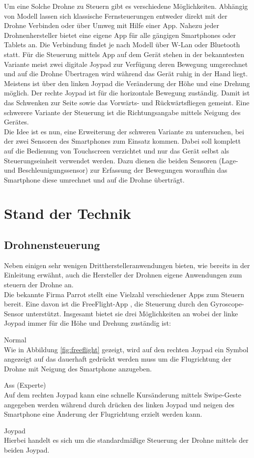 \documentclass{article}
\begin{document}
Um eine Solche Drohne zu Steuern gibt es verschiedene Möglichkeiten. Abhängig von Modell lassen sich klassische Fernsteuerungen\cite{flypad} entweder direkt mit der Drohne Verbinden oder über Umweg mit Hilfe einer App. Nahezu jeder Drohnenhersteller bietet eine eigene App für alle gängigen Smartphones oder Tablets an. Die Verbindung findet je nach Modell über W-Lan oder Bluetooth statt. Für die Steuerung mittels App auf dem Gerät stehen in der bekanntesten Variante meist zwei digitale Joypad zur Verfügung deren Bewegung umgerechnet und auf die Drohne Übertragen wird während das Gerät ruhig in der Hand liegt. Meistens ist über den linken Joypad die Veränderung der Höhe und eine Drehung möglich. Der rechte Joypad ist für die horizontale Bewegung zuständig. Damit ist das Schwenken zur Seite sowie das Vorwärts- und Rückwärtsfliegen gemeint. Eine schwerere Variante der Steuerung ist die Richtungsangabe mittels Neigung des Gerätes.
\\ Die Idee ist es nun, eine Erweiterung der schweren Variante zu untersuchen, bei der zwei Sensoren des Smartphones zum Einsatz kommen. Dabei soll komplett auf die Bedienung von Touchscreen verzichtet und nur das Gerät selbst als Steuerungseinheit verwendet werden. Dazu dienen die beiden Sensoren (Lage- und Beschleunigungssensor) zur Erfassung der Bewegungen\cite{milker2012bewegungserkennung} woraufhin das Smartphone diese umrechnet und auf die Drohne überträgt. 

\section{Stand der Technik}
\label{sec:verwandteArbeiten}
\subsection{Drohnensteuerung}
Neben einigen sehr wenigen Drittherstelleranwendungen bieten, wie bereits in der Einleitung erwähnt, auch die Hersteller der Drohnen eigene Anwendungen zum steuern der Drohne an.
\\ Die bekannte Firma Parrot stellt eine Vielzahl verschiedener Apps zum Steuern bereit. Eine davon ist die FreeFlight-App \cite{freeflightapp}, die Steuerung durch den Gyroscope-Sensor unterstützt. Insgesamt bietet sie drei Möglichkeiten an wobei der linke Joypad immer für die Höhe und Drehung zuständig ist:
\begin{description}
\item Normal \\
Wie in Abbildung \ref{fig:freeflight} gezeigt, wird auf den rechten Joypad ein Symbol angezeigt auf das dauerhaft gedrückt werden muss um die Flugrichtung der Drohne mit Neigung des Smartphone anzugeben.  
\item Ass (Experte) \\
Auf dem rechten Joypad kann eine schnelle Kursänderung mittels Swipe-Geste angegeben werden während durch drücken des linken Joypad und neigen des Smartphone eine Änderung der Flugrichtung erzielt werden kann. 
\item Joypad\\
Hierbei handelt es sich um die standardmäßige Steuerung der Drohne mittels der beiden Joypad.
\end{description}
\end{document}
